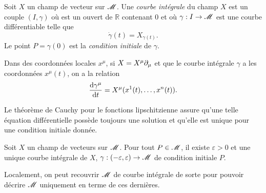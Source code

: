 \documentclass[a4paper,11pt]{report}
\begin{document}
            \begin{defn}
             Soit $X$ un champ de vecteur sur $\mathscr{M}$. Une \textit{courbe intégrale} du champ $X$ est un couple $(I,\gamma)$ où est un ouvert de $\mathbb{R}$ contenant 0 et où $\gamma:I\to\mathscr{M}$ est une courbe différentiable telle que
             \begin{equation}
                 \dot{\gamma}(t) = X_{\gamma(t)}.
             \end{equation}
             Le point $P = \gamma(0)$ est la \textit{condition initiale} de $\gamma$.
            \end{defn}
            
            Dans des coordonnées locales $x^\mu$, si $X = X^\mu\partial_\mu$ et que le courbe intégrale $\gamma$ a les coordonnées $x^\mu(t)$, on a la relation
            \begin{align}
                \dv{\gamma^\mu}{t} = X^\mu(x^1(t),\dots,x^n(t)).
            \end{align}
            
            Le théorème de Cauchy pour le fonctions lipschitzienne assure qu'une telle équation différentielle possède toujours une solution et qu'elle est unique pour une condition initiale donnée.
            
            \begin{prop}
            \begin{leftbar}
                Soit $X$ un champ de vecteurs sur $\mathscr{M}$. Pour tout $P\in\mathscr{M}$, il existe $\varepsilon>0$ et une unique courbe intégrale de $X$, $\gamma:(-\varepsilon,\varepsilon)\to\mathscr{M}$ de condition initiale $P$.
            \end{leftbar}
            \end{prop}
            
            Localement, on peut recouvrir $\mathscr{M}$ de courbe intégrale de sorte pour pouvoir décrire $\mathscr{M}$ uniquement en terme de ces dernières.
            
\end{document}
